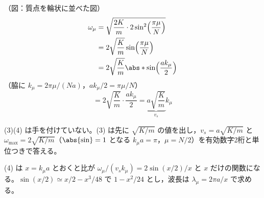 （図：質点を輪状に並べた図）
\begin{align*}
  \omega_\mu&=\sqrt{\frac{2K}{m}\cdot2\sin^{2}\Bigl(\frac{\pi\mu}{N}\Bigr)}\\
  &=2\sqrt{\frac{K}{m}}\sin\Bigl(\frac{\pi\mu}{N}\Bigr)\\
  &=2\sqrt{\frac{K}{m}}\abs*{\sin\Bigl(\frac{ak_\mu}{2}\Bigr)}
\end{align*}
（脇に $k_\mu=2\pi\mu/(Na)$，$ak_\mu/2=\pi\mu/N$）
\[ =2\sqrt{\frac{K}{m}}\cdot\frac{ak_\mu}{2}=\underbrace{a\sqrt{\frac{K}{m}}}_{v_s}k_\mu \]
\mikai
{}
\mikai
\item (3)(4) は手を付けていない。(3) は先に $\sqrt{K/m}$ の値を出し，$v_s=a\sqrt{K/m}$ と $\omega_{\max}=2\sqrt{K/m}$（$\abs{\sin}=1$ となる $k_\mu a=\pi$，$\mu=N/2$）を有効数字2桁と単位つきで答える。
\item (4) は $x=k_\mu a$ とおくと比が $\omega_\mu/(v_sk_\mu)=2\sin(x/2)/x$ と $x$ だけの関数になる。$\sin(x/2)\simeq x/2-x^{3}/48$ で $1-x^{2}/24$ とし，波長は $\lambda_\mu=2\pi a/x$ で求める。
